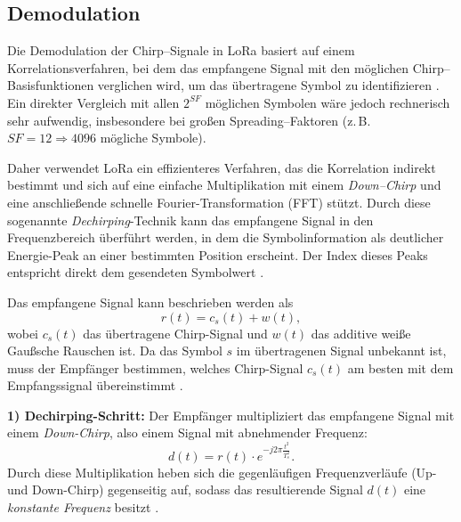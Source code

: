 \subsection{Demodulation \label{lora:demodulation}}

	Die Demodulation der Chirp–Signale in LoRa basiert auf einem Korrelationsverfahren, bei dem das empfangene Signal mit den möglichen Chirp–Basisfunktionen verglichen wird, um das übertragene Symbol zu identifizieren \cite{Afisiadis:2020, Guo:2022}. Ein direkter Vergleich mit allen \( 2^{SF} \) möglichen Symbolen wäre jedoch rechnerisch sehr aufwendig, insbesondere bei gro{\ss}en Spreading–Faktoren (z.\,B. \( SF = 12 \Rightarrow 4096 \) mögliche Symbole).

	\medskip
	Daher verwendet LoRa ein effizienteres Verfahren, das die Korrelation indirekt bestimmt und sich auf eine einfache Multiplikation mit einem \emph{Down–Chirp} und eine anschlie{\ss}ende schnelle Fourier-Transformation (FFT) stützt. Durch diese sogenannte \emph{Dechirping}-Technik kann das empfangene Signal in den Frequenzbereich überführt werden, in dem die Symbolinformation als deutlicher Energie-Peak an einer bestimmten Position erscheint. Der Index dieses Peaks entspricht direkt dem gesendeten Symbolwert \cite{Vangelista:2017}.

	\medskip
	Das empfangene Signal kann beschrieben werden als
	\[
	r(t) = c_s(t) + w(t),
	\]
	wobei \( c_s(t) \) das übertragene Chirp-Signal und \( w(t) \) das additive wei{\ss}e Gau{\ss}sche Rauschen ist. Da das Symbol \( s \) im übertragenen Signal unbekannt ist, muss der Empfänger bestimmen, welches Chirp-Signal \( c_s(t) \) am besten mit dem Empfangssignal übereinstimmt \cite{Vangelista:2017}.
	
	\medskip
	\textbf{1) Dechirping-Schritt:}  
	Der Empfänger multipliziert das empfangene Signal mit einem \emph{Down-Chirp}, also einem Signal mit abnehmender Frequenz:
	\[
	d(t) = r(t) \cdot e^{-j 2 \pi \frac{t^2}{T_s^2}}.
	\]
	Durch diese Multiplikation heben sich die gegenläufigen Frequenzverläufe (Up- und Down-Chirp) gegenseitig auf, sodass das resultierende Signal \( d(t) \) eine \emph{konstante Frequenz} besitzt \cite{Vangelista:2017, Afisiadis:2020}.
	
